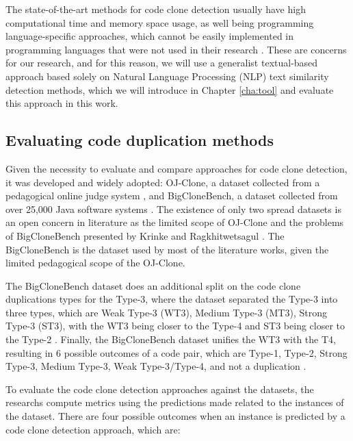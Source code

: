 The state-of-the-art methods for code clone detection usually have high computational time and memory space 
usage, as well being programming language-specific approaches, which cannot be easily implemented in programming 
languages that were not used in their research \citep{litreview}. 
These are concerns for our research, and for this reason, we will use a generalist textual-based approach 
based solely on Natural Language Processing (NLP) text similarity detection methods, which we will introduce 
in Chapter \ref{cha:tool} and evaluate this approach in this work.

\subsection{Evaluating code duplication methods}

\label{subsec:codemethods}

Given the necessity to evaluate and compare approaches for code clone detection, it was developed and widely 
adopted: OJ-Clone, a dataset collected from a pedagogical online judge system \citep{ojclone},
and BigCloneBench, a dataset collected from over 25,000 Java software systems \citep{bigclonebench}. 
The existence of only two spread datasets is an open concern in literature as the limited scope of OJ-Clone 
and the problems of BigCloneBench presented by Krinke and Ragkhitwetsagul \citep{bigfail}. The BigCloneBench
is the dataset used by most of the literature works, given the limited pedagogical scope of the OJ-Clone. 

The BigCloneBench dataset does an additional split on the code clone duplications types for the Type-3,
where the dataset separated the Type-3 into three types, which are Weak Type-3 (WT3), Medium Type-3 (MT3), 
Strong Type-3 (ST3), with the WT3 being closer to the Type-4 and ST3 being closer to the Type-2 \citep{bigclonebench}.
Finally,  the BigCloneBench dataset unifies the WT3 with the T4, resulting in 6 possible outcomes of a code pair, 
which are Type-1, Type-2, Strong Type-3, Medium Type-3, Weak Type-3/Type-4, and not a duplication \citep{bigclonebench}.

To evaluate the code clone detection approaches against the datasets, the researchs compute metrics using 
the predictions made related to the instances of the dataset. There are four possible outcomes when an 
instance is predicted by a code clone detection approach, which are:

